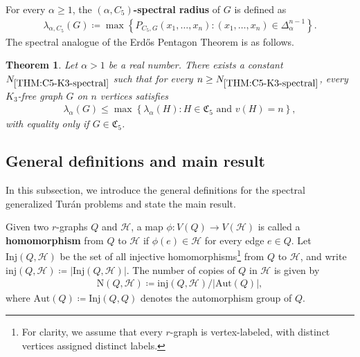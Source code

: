 \documentclass[11pt,a4paper]{article}
\newtheorem{theorem}[definition]{Theorem}
\begin{document}
For every $\alpha \ge 1$, the \textbf{$(\alpha, C_5)$-spectral radius} of $G$ is defined as
\begin{align*}
    \lambda_{\alpha, C_5}(G)
    \coloneqq \max\left\{P_{C_5, G}(x_1, \ldots, x_{n}) \colon (x_1, \ldots, x_{n}) \in \Delta^{n-1}_{\alpha} \right\}. 
\end{align*}
%
The spectral analogue of the Erd\H{o}s Pentagon Theorem is as follows. 
%
\begin{theorem}\label{THM:C5-K3-spectral}
    Let $\alpha > 1$ be a real number. 
    There exists a constant $N_{\ref{THM:C5-K3-spectral}}$ such that for every $n \ge N_{\ref{THM:C5-K3-spectral}}$, every $K_{3}$-free graph $G$ on $n$ vertices satisfies 
    \begin{align*}
        \lambda_{\alpha}(G)
        \le \max\left\{ \lambda_{\alpha}(H) \colon \text{$H \in \mathfrak{C}_5$ and $v(H) = n$}\right\},
    \end{align*}
    with equality only if $G \in \mathfrak{C}_5$. 
\end{theorem}


\subsection{General definitions and main result}
In this subsection, we introduce the general definitions for the spectral generalized Tur\'{a}n problems and state the main result.

Given two $r$-graphs $Q$ and $\mathcal{H}$, a map $\phi \colon V(Q) \to V(\mathcal{H})$ is called a \textbf{homomorphism} from $Q$ to $\mathcal{H}$ if $\phi(e) \in \mathcal{H}$ for every edge $e \in Q$.
Let $\mathrm{Inj}(Q,\mathcal{H})$ be the set of all injective homomorphisms\footnote{For clarity, we assume that every $r$-graph is vertex-labeled, with distinct vertices assigned distinct labels.} from $Q$ to $\mathcal{H}$, and write $\mathrm{inj}(Q,\mathcal{H}) \coloneqq |\mathrm{Inj}(Q,\mathcal{H})|$. 
The number of copies of $Q$ in $\mathcal{H}$ is given by
\begin{align}\label{equ:def-number-Q}
    \mathrm{N}(Q, \mathcal{H})
    \coloneqq \mathrm{inj}(Q, \mathcal{H})/{|\mathrm{Aut}(Q)|}, 
\end{align}
where $\mathrm{Aut}(Q) \coloneqq \mathrm{Inj}(Q, Q)$ denotes the automorphism group of $Q$.
\end{document}
